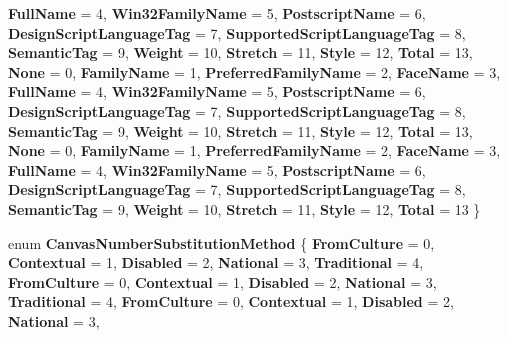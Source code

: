 \begin{DoxyCompactItemize}
{\bfseries Full\+Name} = 4, 
{\bfseries Win32\+Family\+Name} = 5, 
{\bfseries Postscript\+Name} = 6, 
{\bfseries Design\+Script\+Language\+Tag} = 7, 
\newline
{\bfseries Supported\+Script\+Language\+Tag} = 8, 
{\bfseries Semantic\+Tag} = 9, 
{\bfseries Weight} = 10, 
{\bfseries Stretch} = 11, 
\newline
{\bfseries Style} = 12, 
{\bfseries Total} = 13, 
{\bfseries None} = 0, 
{\bfseries Family\+Name} = 1, 
\newline
{\bfseries Preferred\+Family\+Name} = 2, 
{\bfseries Face\+Name} = 3, 
{\bfseries Full\+Name} = 4, 
{\bfseries Win32\+Family\+Name} = 5, 
\newline
{\bfseries Postscript\+Name} = 6, 
{\bfseries Design\+Script\+Language\+Tag} = 7, 
{\bfseries Supported\+Script\+Language\+Tag} = 8, 
{\bfseries Semantic\+Tag} = 9, 
\newline
{\bfseries Weight} = 10, 
{\bfseries Stretch} = 11, 
{\bfseries Style} = 12, 
{\bfseries Total} = 13, 
\newline
{\bfseries None} = 0, 
{\bfseries Family\+Name} = 1, 
{\bfseries Preferred\+Family\+Name} = 2, 
{\bfseries Face\+Name} = 3, 
\newline
{\bfseries Full\+Name} = 4, 
{\bfseries Win32\+Family\+Name} = 5, 
{\bfseries Postscript\+Name} = 6, 
{\bfseries Design\+Script\+Language\+Tag} = 7, 
\newline
{\bfseries Supported\+Script\+Language\+Tag} = 8, 
{\bfseries Semantic\+Tag} = 9, 
{\bfseries Weight} = 10, 
{\bfseries Stretch} = 11, 
\newline
{\bfseries Style} = 12, 
{\bfseries Total} = 13
 \}
\item 
\mbox{\label{namespace_microsoft_1_1_graphics_1_1_canvas_1_1_text_a1b27923c53dacedc3dd21565fd3939d0}} 
enum {\bfseries Canvas\+Number\+Substitution\+Method} \{ \newline
{\bfseries From\+Culture} = 0, 
{\bfseries Contextual} = 1, 
{\bfseries Disabled} = 2, 
{\bfseries National} = 3, 
\newline
{\bfseries Traditional} = 4, 
{\bfseries From\+Culture} = 0, 
{\bfseries Contextual} = 1, 
{\bfseries Disabled} = 2, 
\newline
{\bfseries National} = 3, 
{\bfseries Traditional} = 4, 
{\bfseries From\+Culture} = 0, 
{\bfseries Contextual} = 1, 
\newline
{\bfseries Disabled} = 2, 
{\bfseries National} = 3, 

\end{DoxyCompactItemize}
